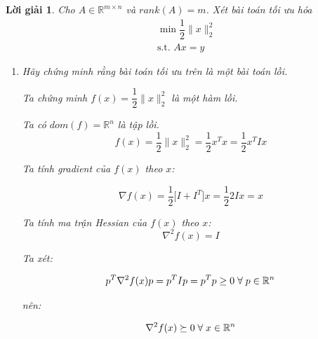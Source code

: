 \documentclass[14pt, a4paper]{article}
\theoremstyle{sltheorem}
\theoremstyle{soltheorem}
\newtheorem*{loigiai}{Lời giải}
\begin{document}
    \begin{loigiai}

        Cho $A \in \mathbb{R}^{m\times n}$ và $rank(A)=m$. Xét bài toán tối ưu hóa
        \begin{equation*}
            \begin{aligned}
                &\min \dfrac{1}{2} \lVert x \rVert_2^2 \\ &\text{s.t. }Ax=y
            \end{aligned}
        \end{equation*}
        
        \begin{enumerate} [wide, labelwidth=!, labelindent=0pt,label=\textbf{\arabic*}.]
            \item Hãy chứng minh rằng bài toán tối ưu trên là một bài toán lồi.
            
            Ta chứng minh $f(x)=\dfrac{1}{2} \lVert x \rVert_2^2$ là một hàm lồi.
            
            Ta có $dom(f)=\mathbb{R}^n$ là tập lồi.
            \begin{equation*}
                f(x)=\dfrac{1}{2} \lVert x \rVert_2^2=\dfrac{1}{2}x^T x=\dfrac{1}{2}x^T I x
            \end{equation*}

            Ta tính gradient của $f(x)$ theo $x$:

            \begin{equation*}
                \nabla f(x)=\dfrac{1}{2} \Big\lbrack I + I^T \Big\rbrack x=\dfrac{1}{2}2Ix=x
            \end{equation*}

            Ta tính ma trận Hessian của $f(x)$ theo $x$:
            \begin{equation*}
                \nabla^2 f(x)=I
            \end{equation*}

            Ta xét:

            \begin{equation*}
                p^T \nabla^2 f(x) p=p^T I p = p^T p \geq 0 \thickspace \forall \thickspace p \in \mathbb{R}^n
            \end{equation*}

            nên:

            \begin{equation*}
                \nabla^2 f(x) \succeq 0 \thickspace \forall \thickspace x \in \mathbb{R}^n
            \end{equation*}


\end{enumerate}
\end{loigiai}
\end{document}
